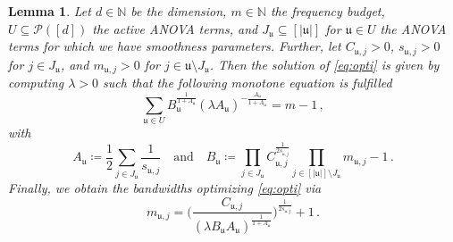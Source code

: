 \documentclass[a4paper]{scrartcl}
\numberwithin{equation}{section}
\newtheorem{lemma}[theorem]{Lemma}
\begin{document}
\begin{lemma}\label{optimalbandwidth} Let $d\in\mathds N$ be the dimension, $m\in\mathds N$ the frequency budget, $U\subseteq\mathcal P([d])$ the active ANOVA terms, and $J_{\mathfrak u} \subseteq [|\mathfrak u|]$ for $\mathfrak u\in U$ the ANOVA terms for which we have smoothness parameters.
    Further, let $C_{\mathfrak u,j}>0$, $s_{\mathfrak u,j}>0$ for $j\in J_{\mathfrak u}$, and $m_{\mathfrak u,j}>0$ for $j\in \mathfrak u\setminus J_{\mathfrak u}$.
    Then the solution of \eqref{eq:opti} is given by computing $\lambda>0$ such that the following monotone equation is fulfilled
    \begin{equation}\label{eq:optimallambda}
        \sum_{\mathfrak u\in U} B_{\mathfrak u}^{\frac{1}{1+A_{\mathfrak u}}} (\lambda A_{\mathfrak u})^{-\frac{A_{\mathfrak u}}{1+A_{\mathfrak u}}}
        = m-1 \,,
    \end{equation}
    with
    \begin{equation*}
        A_{\mathfrak u} \coloneqq \frac 12 \sum_{j\in J_{\mathfrak u}} \frac{1}{s_{\mathfrak u,j}}
        \quad\text{and}\quad
        B_{\mathfrak u} \coloneqq \prod_{j\in J_{\mathfrak u}} C_{\mathfrak u,j}^{\frac{1}{2s_{\mathfrak u,j}}} \prod_{j\in[|\mathfrak u|]\setminus J_{\mathfrak u}} m_{\mathfrak u,j}-1 \,.
    \end{equation*}
    Finally, we obtain the bandwidths optimizing \eqref{eq:opti} via
    \begin{equation*}
        m_{\mathfrak u,j} = \Big(\frac{C_{\mathfrak u,j}}{(\lambda B_{\mathfrak u} A_{\mathfrak u})^{\frac{1}{1+A_{\mathfrak u}}}}\Big)^{\frac{1}{2s_{\mathfrak u,j}}} + 1 \,.
    \end{equation*}
\end{lemma} 
\end{document}
